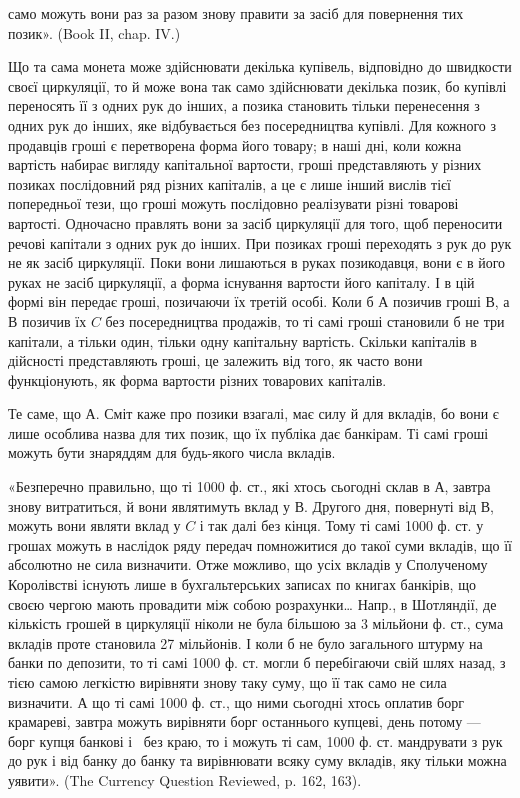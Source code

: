 \parcont{}  %
само можуть вони раз за разом знову правити за засіб для повернення тих
позик». (Book II, chap. IV.)

Що та сама монета може здійснювати декілька купівель, відповідно до швидкости
своєї циркуляції, то й може вона так само здійснювати декілька позик, бо купівлі
переносять її з одних рук до інших, а позика становить тільки перенесення з одних
рук до інших, яке відбувається без посередництва купівлі. Для кожного з продавців
гроші є перетворена форма його товару; в наші дні, коли кожна вартість набирає
вигляду капітальної вартости, гроші представляють у різних позиках послідовний
ряд різних капіталів, а це є лише інший вислів тієї попередньої тези, що гроші
можуть послідовно реалізувати різні товарові вартості. Одночасно правлять
вони за засіб циркуляції для того, щоб переносити речові капітали з одних рук до
інших. При позиках гроші переходять з рук до рук не як засіб циркуляції. Поки
вони лишаються в руках позикодавця, вони є в його руках не засіб циркуляції, а
форма існування вартости його капіталу. І в цій формі він передає гроші, позичаючи
їх третій особі. Коли б $А$ позичив гроші $В$, а $В$ позичив їх $C$ без
посередництва продажів, то ті самі гроші становили б не три капітали, а тільки
один, тільки одну капітальну вартість. Скільки капіталів в дійсності представляють
гроші, це залежить від того, як часто вони функціонують, як форма
вартости різних товарових капіталів.

Те саме, що А. Сміт каже про позики взагалі, має силу й для вкладів,
бо вони є лише особлива назва для тих позик, що їх публіка дає банкірам.
Ті самі гроші можуть бути знаряддям для будь-якого числа вкладів.

«Безперечно правильно, що ті 1000 ф. ст., які хтось сьогодні склав в А,
завтра знову витратиться, й вони являтимуть вклад у $В$. Другого дня, повернуті
від $В$, можуть вони являти вклад у $C$ і так далі без кінця. Тому ті самі
1000 ф. ст. у грошах можуть в наслідок ряду передач помножитися до такої
суми вкладів, що її абсолютно не сила визначити. Отже можливо, що  усіх
вкладів у Сполученому Королівстві існують лише в бухгальтерських записах
по книгах банкірів, що своєю чергою мають провадити між собою розрахунки\dots{}
Напр., в Шотляндії, де кількість грошей в циркуляції ніколи не була більшою
за 3 мільйони ф. ст., сума вкладів проте становила 27 мільйонів. І коли б не
було загального штурму на банки по депозити, то ті самі 1000 ф. ст. могли б
перебігаючи свій шлях назад, з тією самою легкістю вирівняти знову таку суму,
що її так само не сила визначити. А що ті самі 1000 ф. ст., що ними сьогодні
хтось оплатив борг крамареві, завтра можуть вирівняти борг останнього купцеві,
день потому — борг купця банкові і~ без краю, то і можуть ті сам,
1000 ф. ст. мандрувати з рук до рук і від банку до банку та вирівнювати
всяку суму вкладів, яку тільки можна уявити». (The Currency Question Reviewed,
p. 162, 163).

